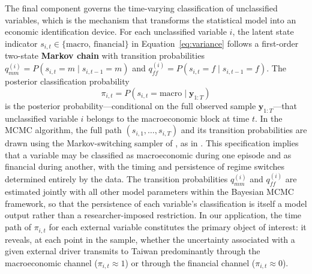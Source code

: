 The final component governs the time-varying classification of unclassified variables, which is the mechanism that transforms the statistical model into an economic identification device. For each unclassified variable $i$, the latent state indicator $s_{i,t} \in \{\text{macro},\, \text{financial}\}$ in Equation~\eqref{eq:variance} follows a first-order two-state \textbf{Markov chain} with transition probabilities $q_{mm}^{(i)} = P(s_{i,t} = m \mid s_{i,t-1} = m)$ and $q_{ff}^{(i)} = P(s_{i,t} = f \mid s_{i,t-1} = f)$. The posterior classification probability
%
\begin{equation}
\pi_{i,t} = P(s_{i,t} = \text{macro} \mid \mathbf{y}_{1:T})
\label{eq:pi}
\end{equation}
%
is the posterior probability---conditional on the full observed sample $\mathbf{y}_{1:T}$---that unclassified variable $i$ belongs to the macroeconomic block at time $t$. In the MCMC algorithm, the full path $(s_{i,1},\ldots,s_{i,T})$ and its transition probabilities are drawn using the Markov-switching sampler of \citet{chib1996calculating}, as in \citet{davidson2025investigating}. This specification implies that a variable may be classified as macroeconomic during one episode and as financial during another, with the timing and persistence of regime switches determined entirely by the data. The transition probabilities $q_{mm}^{(i)}$ and $q_{ff}^{(i)}$ are estimated jointly with all other model parameters within the Bayesian MCMC framework, so that the persistence of each variable's classification is itself a model output rather than a researcher-imposed restriction. In our application, the time path of $\pi_{i,t}$ for each external variable constitutes the primary object of interest: it reveals, at each point in the sample, whether the uncertainty associated with a given external driver transmits to Taiwan predominantly through the macroeconomic channel ($\pi_{i,t} \approx 1$) or through the financial channel ($\pi_{i,t} \approx 0$).

